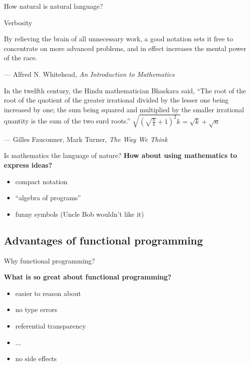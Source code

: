 \documentclass{beamer}
\begin{document}
\begin{frame}{How natural is natural language?}

  Verbosity
  \pause
  \begin{displayquote}
    By relieving the brain of all unnecessary work, a good notation
    sets it free to concentrate on more advanced problems, and
    in effect increases the mental power of the race.
  \end{displayquote}
  --- Alfred N. Whitehead, \textit{An Introduction to Mathematics}
  \pause
  \begin{small}
  \begin{displayquote}
    In the twelfth century, the Hindu mathematician Bhaskara said,
    ``The root of the root of the quotient of the greater irrational
    divided by the lesser one being increased by one; the sum being
    squared and multiplied by the smaller irrational quantity is the
    sum of the two surd roots.''
    \pause
    $\sqrt{(\sqrt{\frac{n}{k}}+1)^{2}k}=\sqrt{k}+\sqrt{n}$
  \end{displayquote}
  \end{small}
  --- Gilles Fauconner, Mark Turner, \textit{The Way We Think}
  
\end{frame}

\begin{frame}{Is mathematics the language of nature?}
  \textbf{How about using mathematics to express ideas?}
  \begin{itemize}
    \pause
  \item compact notation
    \pause
  \item ``algebra of programs''
    \pause
  \item funny symbols (Uncle Bob wouldn't like it)
  \end{itemize}
\end{frame}

\subsection{Advantages of functional programming}

\begin{frame}{Why functional programming?}

  \textbf{What is so great about functional programming?}  
  \begin{itemize}
    \pause
  \item easier to reason about
    \pause
  \item no type errors
    \pause
  \item referential transparency
    \pause
  \item ...
    \pause
  \item no side effects
  \end{itemize}
  
\end{frame}
\end{document}
